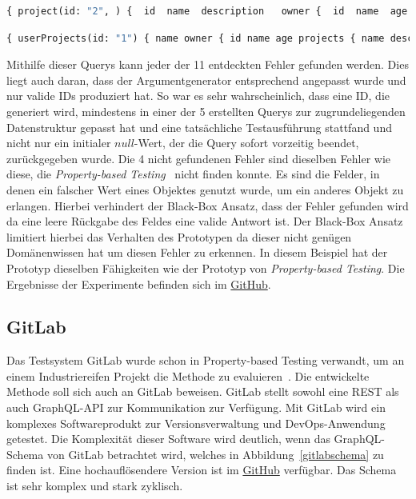 \begin{lstlisting}[language=GraphQL, caption={Query 1}, label={q1}]
    { project(id: "2", ) {  id  name  description   owner {  id  name  age   }  }  }
\end{lstlisting}

\begin{lstlisting}[language=GraphQL, caption={Query2}, label={q2}]
    { userProjects(id: "1") { name owner { id name age projects { name description id owner { id name age } } } } }
\end{lstlisting}

Mithilfe dieser Querys kann jeder der 11 entdeckten Fehler gefunden werden.
Dies liegt auch daran, dass der Argumentgenerator entsprechend angepasst wurde und nur valide IDs produziert hat.
So war es sehr wahrscheinlich, dass eine ID, die generiert wird, mindestens in einer der 5 erstellten Querys zur zugrundeliegenden Datenstruktur gepasst hat
und eine tatsächliche Testausführung stattfand und nicht nur ein initialer $null$-Wert, der die Query sofort vorzeitig beendet, zurückgegeben wurde.
Die 4 nicht gefundenen Fehler sind dieselben Fehler wie diese, die \textit{Property-based Testing}~\cite[vgl. RQ.2]{property-based-testing} nicht finden konnte.
Es sind die Felder, in denen ein falscher Wert eines Objektes genutzt wurde, um ein anderes Objekt zu erlangen.
Hierbei verhindert der Black-Box Ansatz, dass der Fehler gefunden wird da eine leere Rückgabe des Feldes eine valide Antwort ist.
Der Black-Box Ansatz limitiert hierbei das Verhalten des Prototypen da dieser nicht genügen Domänenwissen hat um diesen Fehler zu erkennen.
In diesem Beispiel hat der Prototyp dieselben Fähigkeiten wie der Prototyp von \textit{Property-based Testing}.
Die Ergebnisse der Experimente befinden sich im \href{https://github.com/gernhard1337/GraphQL-Testautomatisierung/tree/main/experiment/toy-experiment}{GitHub}.

\subsection{GitLab}

Das Testsystem GitLab wurde schon in Property-based  Testing verwandt, um an einem Industriereifen Projekt die Methode zu evaluieren~\cite[vgl. Experiment]{property-based-testing}.
Die entwickelte Methode soll sich auch an GitLab beweisen.
GitLab stellt sowohl eine REST als auch GraphQL-API zur Kommunikation  zur  Verfügung.
Mit GitLab wird ein komplexes Softwareprodukt zur Versionsverwaltung und DevOps-Anwendung getestet.
Die Komplexität dieser Software wird deutlich, wenn das GraphQL-Schema von GitLab betrachtet wird, welches in Abbildung~\ref{gitlabschema} zu finden ist.
Eine hochauflösendere Version ist im \href{https://github.com/gernhard1337/GraphQL-Testautomatisierung/blob/main/latex/img/gitlabgraph.png}{GitHub} verfügbar.
Das Schema ist sehr komplex und stark zyklisch.

